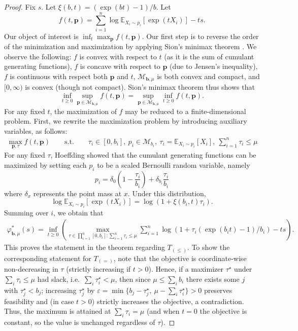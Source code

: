 \documentclass[12pt]{article}
\theoremstyle{plain}
\begin{document}
\begin{appendix}
\begin{proof}

Fix $s$. Let $\xi(b,t)=(\exp(bt)-1)/b$.  Let
\[
f(t,\boldsymbol{p})=\sum_{i=1}^n\log \mathbb{E}_{X_{i}\sim p_{i}}[\exp(tX_{i})]-ts.
\]
Our object of interest is $\inf_{t}\max_{\boldsymbol{p}}f(t,\boldsymbol{p})$.
Our first step is to reverse the order of the minimization and maximization
by applying Sion's minimax theorem \citep{komiya1988elementary}. We observe the following: $f$ is convex with respect to $t$ (as it is the sum of cumulant generating functions), $f$ is concave with respect to $\boldsymbol{p}$ (due to Jensen's
inequality), $f$ is continuous with respect both $\boldsymbol{p}$ and $t$, $\mathcal{M}_{\boldsymbol{b},\mu}$ is both convex and compact, and $[0,\infty)$ is convex (though not compact).  Sion's minimax theorem thus shows that
\[
\inf_{t\geq0}\sup_{\boldsymbol{p}\in\mathcal{M}_{\boldsymbol{b},\mu}}f(t,\boldsymbol{p})=\sup_{\boldsymbol{p}\in\mathcal{M}_{\boldsymbol{b},\mu}}\inf_{t\geq0}f(t,\boldsymbol{p}).
\]
For any fixed $t$, the maximization of $f$ may be reduced to a finite-dimensional
problem. First, we rewrite the maximization problem by introducing
auxiliary variables, as follows:
\begin{gather*}
\max_{\boldsymbol{p},\tau} f(t,\boldsymbol{p}) \qquad
\mathrm{s.t.}\qquad  \tau_{i}\in[0,b_i],\ p_{i}\in\mathcal{M}_{b_i},\ \tau_{i}=\mathbb{E}_{X_{i}\sim p_{i}}\left[X_{i}\right],\ \sum_{i=1}^n\tau_{i} \leq \mu
\end{gather*}
For any fixed $\tau$, Hoeffding \citep[proof of Theorem 1]{hoeffding_probability_1963} showed that the cumulant generating
functions can be maximized by setting each $p_{i}$ to be a scaled
Bernoulli random variable, namely
\[
p_{i}=\delta_{0}\left(1-\frac{\tau_{i}}{b_i}\right)+\delta_{b_i}\frac{\tau_{i}}{b_i}
\]
where $\delta_{x}$ represents the point mass at $x$. Under this
distribution,
\[
\log \mathbb{E}_{X_i \sim p_{i}}\left[\exp\left(tX_{i}\right)\right]=\log\left(1+\xi(b_i,t)\tau_{i}\right).
\]
Summing over $i$, we obtain that
\begin{gather*}
\varphi^*_{\boldsymbol{b},\mu}(s)
= \inf_{t\geq 0} \left(\max_{\tau\in \prod_{i=1}^n [0,b_i]: \sum_{i=1}^n \tau_i \leq \mu} \sum_{i=1}^n \log\left(1+\tau_i (\exp(b_i t)-1)/b_i \right) - ts\right).
\end{gather*}
This proves the statement in the theorem regarding $T_{(\leq)}$.  To show the corresponding statement for $T_{(=)}$, note that the objective is coordinate-wise non-decreasing in $\tau$ (strictly increasing if $t>0$).  Hence, if a maximizer $\tau^\star$ under $\sum_i\tau_i\le \mu$ had slack, i.e.\ $\sum_i\tau_i^\star<\mu$, then since
$\mu\le\sum_i b_i$ there exists some $j$ with $\tau_j^\star<b_j$; increasing $\tau_j^\star$ by
$\varepsilon=\min\{b_j-\tau_j^\star,\ \mu-\sum_i\tau_i^\star\}>0$ preserves feasibility and
(in case $t>0$) strictly increases the objective, a contradiction.  Thus, the maximum is attained at
$\sum_i\tau_i=\mu$ (and when $t=0$ the objective is constant, so the value is unchanged regardless of $\tau$).


\end{proof}
\end{appendix}
\end{document}
